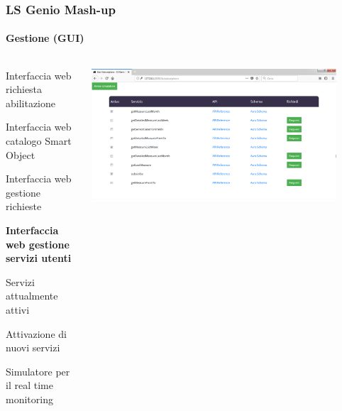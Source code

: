 \documentclass{beamer}
\begin{document}
\begin{frame}[noframenumbering]
\frametitle{LS Genio Mash-up}
\framesubtitle{Gestione (GUI)}
\begin{columns}[T] %
	\begin{column}{.3\textwidth}
		
		\begin{itemize}
			{\tiny
			\item Interfaccia web richiesta abilitazione
			\item Interfaccia web catalogo Smart Object
			\item Interfaccia web gestione richieste
			\item \textbf{Interfaccia web gestione servizi utenti}
			
			\begin{itemize}
				{\tiny
				\item Servizi attualmente attivi
				\item Attivazione di nuovi servizi
				\item Simulatore per il real time monitoring
				}
			\end{itemize}
			}
		\end{itemize}
	
	\end{column}%
	\hfill%
	\begin{column}{.66\textwidth}
		\includegraphics[width=0.9\textwidth]{images/UserSubscriptionsPlatform.png}
	\end{column}%
\end{columns}
\end{frame}



\end{document}
